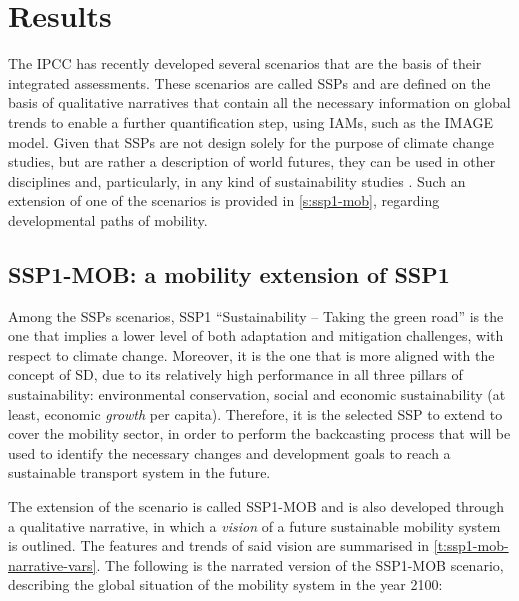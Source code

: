 \chapter{Results}
\label{c:results}

The \gls{IPCC} has recently developed several scenarios that are the basis of their integrated assessments. These scenarios are called \glspl{SSP} and are defined on the basis of qualitative narratives that contain all the necessary information on global trends to enable a further quantification step, using \glspl{IAM}, such as the IMAGE model. Given that \glspl{SSP} are not design solely for the purpose of climate change studies, but are rather a description of world futures, they can be used in other disciplines and, particularly, in any kind of sustainability studies . Such an extension of one of the scenarios is provided in \autoref{s:ssp1-mob}, regarding developmental paths of mobility.

\section{SSP1-MOB: a mobility extension of SSP1}
\label{s:ssp1-mob}

Among the \glspl{SSP} scenarios, SSP1 ``Sustainability -- Taking the green road'' is the one that implies a lower level of both adaptation and mitigation challenges, with respect to climate change. Moreover, it is the one that is more aligned with the concept of \gls{SD}, due to its relatively high performance in all three pillars of sustainability: environmental conservation, social and economic sustainability (at least, economic \textit{growth} per capita). Therefore, it is the selected \gls{SSP} to extend to cover the mobility sector, in order to perform the backcasting process that will be used to identify the necessary changes and development goals to reach a sustainable transport system in the future.

The extension of the scenario is called \gls{SSP1-MOB} and is also developed through a qualitative narrative, in which a \textit{vision} of a future sustainable mobility system is outlined. The features and trends of said vision are summarised in \autoref{t:ssp1-mob-narrative-vars}. The following is the narrated version of the \gls{SSP1-MOB} scenario, describing the global situation of the mobility system in the year 2100:

